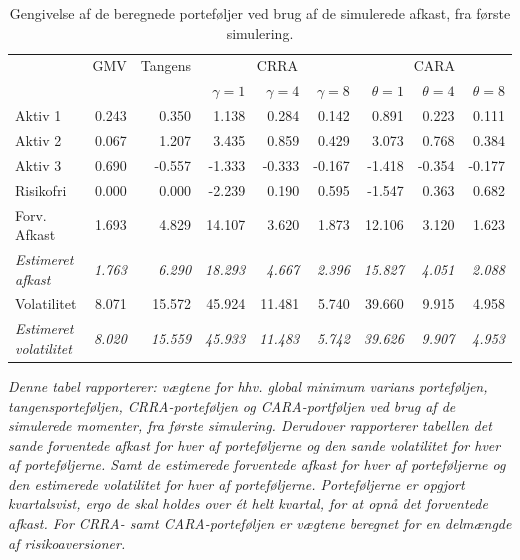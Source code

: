 \documentclass[
  a4paper,
  oneside]{memoir}
\begin{document}
\begin{table}[H]

\caption{\label{tab:sum-1}Gengivelse af de beregnede porteføljer ved brug af de simulerede afkast, fra første simulering.}
\centering
\begin{threeparttable}
\begin{tabular}[t]{lrrrrrrrr}
\toprule
\multicolumn{1}{c}{ } & \multicolumn{1}{c}{GMV} & \multicolumn{1}{c}{Tangens} & \multicolumn{3}{c}{CRRA} & \multicolumn{3}{c}{CARA} \\
\cmidrule(l{3pt}r{3pt}){2-2} \cmidrule(l{3pt}r{3pt}){3-3} \cmidrule(l{3pt}r{3pt}){4-6} \cmidrule(l{3pt}r{3pt}){7-9}
  &   &   & $\gamma=1$ & $\gamma=4$ & $\gamma=8$ & $\theta=1$ & $\theta=4$ & $\theta=8$\\
\midrule
\rowcolor{gray!6}  Aktiv 1 & 0.243 & 0.350 & 1.138 & 0.284 & 0.142 & 0.891 & 0.223 & 0.111\\
Aktiv 2 & 0.067 & 1.207 & 3.435 & 0.859 & 0.429 & 3.073 & 0.768 & 0.384\\
\rowcolor{gray!6}  Aktiv 3 & 0.690 & -0.557 & -1.333 & -0.333 & -0.167 & -1.418 & -0.354 & -0.177\\
Risikofri & 0.000 & 0.000 & -2.239 & 0.190 & 0.595 & -1.547 & 0.363 & 0.682\\
\rowcolor{gray!6}  Forv. Afkast & 1.693 & 4.829 & 14.107 & 3.620 & 1.873 & 12.106 & 3.120 & 1.623\\
\em{Estimeret afkast} & \em{1.763} & \em{6.290} & \em{18.293} & \em{4.667} & \em{2.396} & \em{15.827} & \em{4.051} & \em{2.088}\\
\rowcolor{gray!6}  Volatilitet & 8.071 & 15.572 & 45.924 & 11.481 & 5.740 & 39.660 & 9.915 & 4.958\\
\em{Estimeret volatilitet} & \em{8.020} & \em{15.559} & \em{45.933} & \em{11.483} & \em{5.742} & \em{39.626} & \em{9.907} & \em{4.953}\\
\bottomrule
\end{tabular}
\begin{tablenotes}
\item \textit{Denne tabel rapporterer: vægtene for hhv. global minimum varians porteføljen, tangensporteføljen, CRRA-porteføljen og CARA-portføljen ved brug af de simulerede momenter, fra første simulering. Derudover rapporterer tabellen det sande forventede afkast for hver af porteføljerne og den sande volatilitet for hver af porteføljerne.  Samt de estimerede forventede afkast for hver af porteføljerne og den estimerede volatilitet for hver af porteføljerne. Porteføljerne er opgjort kvartalsvist, ergo de skal holdes over ét helt kvartal, for at opnå det forventede afkast. For CRRA- samt CARA-porteføljen er vægtene beregnet for en delmængde af risikoaversioner.}
\end{tablenotes}
\end{threeparttable}
\end{table}
\end{document}
